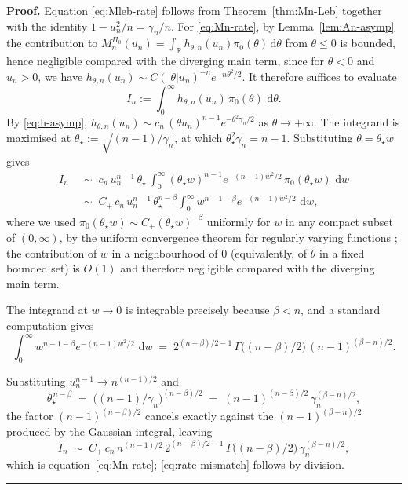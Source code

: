 \documentclass{article}%
\newenvironment{proof}[1][Proof]{\noindent\textbf{#1.} }{\ \rule{0.5em}{0.5em}}
\newcommand{\dd}{\,\mathrm{d}}
\newcommand{\1}{\mathbf{1}}
\begin{document}
\begin{proof}
Equation \eqref{eq:Mleb-rate} follows from Theorem~\ref{thm:Mn-Leb}
together with the identity \(1-u_n^2/n=\gamma_n/n\). For
\eqref{eq:Mn-rate}, by Lemma~\ref{lem:An-asymp} the contribution to
\(M_n^{\Pi_0}(u_n)=\int_\mathbb{R} h_{\theta,n}(u_n)\pi_0(\theta)\dd\theta\)
from \(\theta\leq 0\) is bounded, hence negligible compared with the diverging main term, since for
\(\theta<0\) and \(u_n>0\), we have
\(h_{\theta,n}(u_n)\sim C(|\theta| u_n)^{-n}e^{-n\theta^2/2}\). It
therefore suffices to evaluate
\[
   I_n:=\int_0^\infty h_{\theta,n}(u_n)\,\pi_0(\theta)\,\dd\theta.
\]
By \eqref{eq:h-asymp},
\(h_{\theta,n}(u_n)\sim c_n\,(\theta u_n)^{n-1}e^{-\theta^2\gamma_n/2}\)
as \(\theta\to+\infty\). The integrand is maximised at \(\theta_\star:=\sqrt{(n-1)/\gamma_n}\), at which
\(\theta_\star^2\gamma_n=n-1\). Substituting \(\theta=\theta_\star w\)
gives
\allowdisplaybreaks
\begin{align*}
  I_n
  &\;\sim\; c_n\,u_n^{n-1}\,\theta_\star\,
     \int_0^\infty (\theta_\star w)^{n-1}e^{-(n-1)w^2/2}\,
     \pi_0(\theta_\star w)\,\dd w\\
  &\;\sim\; C_+\,c_n\,u_n^{n-1}\,\theta_\star^{n-\beta}
     \int_0^\infty w^{n-1-\beta}e^{-(n-1)w^2/2}\,\dd w,
\end{align*}
where we used \(\pi_0(\theta_\star w)\sim C_+(\theta_\star w)^{-\beta}\) uniformly for \(w\) in any compact subset of \((0,\infty)\), by the uniform convergence theorem for regularly varying functions \cite[Thm.~1.2.1]{bingham1989regular}; the contribution of \(w\) in a neighbourhood of \(0\) (equivalently, of \(\theta\) in a
fixed bounded set) is \(O(1)\) and therefore negligible compared with the
diverging main term.

The integrand at
\(w\to 0\) is integrable precisely because \(\beta<n\), and a
standard computation gives
\[
  \int_0^\infty w^{n-1-\beta}e^{-(n-1)w^2/2}\,\dd w
  \;=\; 2^{(n-\beta)/2-1}\,\Gamma\!\bigl((n-\beta)/2\bigr)\,
        (n-1)^{(\beta-n)/2}.
\]

Substituting $u_n^{n-1} \to n^{(n-1)/2}$ and
\[
  \theta_\star^{\,n-\beta} 
  \;=\; \bigl((n-1)/\gamma_n\bigr)^{(n-\beta)/2}
  \;=\; (n-1)^{(n-\beta)/2}\, \gamma_n^{(\beta-n)/2},
\]
the factor $(n-1)^{(n-\beta)/2}$ cancels exactly against the 
$(n-1)^{(\beta-n)/2}$ produced by the Gaussian integral, leaving
\[
  I_n \;\sim\; C_+\, c_n\, n^{(n-1)/2}\, 2^{(n-\beta)/2-1}\, 
  \Gamma\!\bigl((n-\beta)/2\bigr)\, \gamma_n^{(\beta-n)/2},
\]
which is equation~\eqref{eq:Mn-rate}; \eqref{eq:rate-mismatch} follows by division.
\end{proof}
\end{document}
